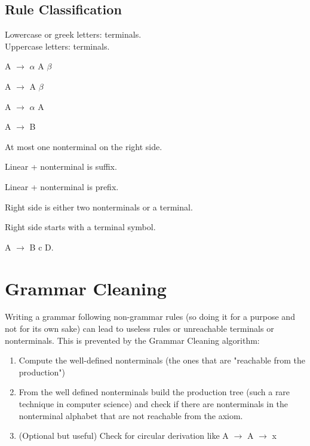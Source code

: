 		\subsection{Rule Classification}
			Lowercase or greek letters: terminals.\\
			Uppercase letters: terminals.
			\begin{definition}[Recursive]
				A $\rightarrow$ $\alpha$ A $\beta$ 
			\end{definition}
			\begin{definition}
				A $\rightarrow$ A $\beta$ 
			\end{definition}
			\begin{definition}
				A $\rightarrow$ $\alpha$ A
			\end{definition}
			\begin{definition}[Copy]
				A $\rightarrow$ B
			\end{definition}
			\begin{definition}[Linear]
				At most one nonterminal on the right side.
			\end{definition}
			\begin{definition}
				Linear + nonterminal is suffix.
			\end{definition}
			\begin{definition}
				Linear + nonterminal is prefix.
			\end{definition}
			\begin{definition}[Chomsky]
				Right side is either two nonterminals or a terminal.
			\end{definition}
			\begin{definition}
				Right side starts with a terminal symbol.
			\end{definition}
			\begin{definition}
				A $\rightarrow$ B c D.
			\end{definition}
    \section{Grammar Cleaning}
        Writing a grammar following non-grammar rules (so doing it for a purpose and not for its own sake) can lead to useless rules or unreachable 
		terminals or nonterminals. This is prevented by the Grammar Cleaning algorithm:
            \begin{enumerate}
                \item Compute the well-defined nonterminals (the ones that are "reachable from the production")
                \item From the well defined nonterminals build the production tree (such a rare technique in computer science) and check if there are nonterminals in 
				the nonterminal alphabet that are not reachable from the axiom.
                \item (Optional but useful) Check for circular derivation like A $\rightarrow$ A $\rightarrow$ x
            \end{enumerate}
    
